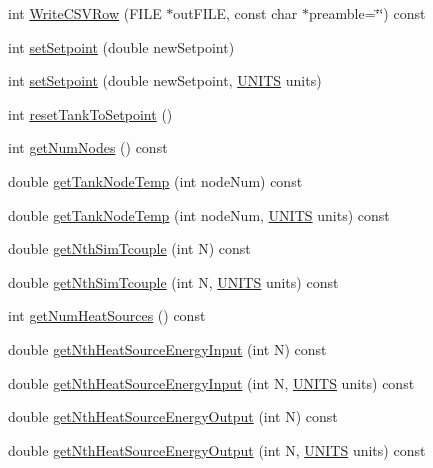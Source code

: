 \begin{DoxyCompactItemize}
\item 
int \hyperlink{class_h_p_w_h_a5652291d663296decd912fe92fb9d4e7}{Write\-C\-S\-V\-Row} (F\-I\-L\-E $\ast$out\-F\-I\-L\-E, const char $\ast$preamble=\char`\"{}\char`\"{}) const 
\item 
int \hyperlink{class_h_p_w_h_adb49b5846f9056602de57cb289e0a321}{set\-Setpoint} (double new\-Setpoint)
\item 
int \hyperlink{class_h_p_w_h_ab7d91fead271ef907cf13450055cdb06}{set\-Setpoint} (double new\-Setpoint, \hyperlink{class_h_p_w_h_a145320dbf116b9245ac4421026cff294}{U\-N\-I\-T\-S} units)
\item 
int \hyperlink{class_h_p_w_h_aac5af7347053c06dcbc446b44fa3686d}{reset\-Tank\-To\-Setpoint} ()
\item 
int \hyperlink{class_h_p_w_h_a38e4f7eb3da82c2281657702fc472b1d}{get\-Num\-Nodes} () const 
\item 
double \hyperlink{class_h_p_w_h_a440f55f294a28f9024ce4731f515b802}{get\-Tank\-Node\-Temp} (int node\-Num) const 
\item 
double \hyperlink{class_h_p_w_h_afac039cdb5bb3643eb46fdef08a88948}{get\-Tank\-Node\-Temp} (int node\-Num, \hyperlink{class_h_p_w_h_a145320dbf116b9245ac4421026cff294}{U\-N\-I\-T\-S} units) const 
\item 
double \hyperlink{class_h_p_w_h_a3fc011d8bc8302e62d45e8fc92d1ce3e}{get\-Nth\-Sim\-Tcouple} (int N) const 
\item 
double \hyperlink{class_h_p_w_h_a87a26a59001216562f01eed1a0b877fe}{get\-Nth\-Sim\-Tcouple} (int N, \hyperlink{class_h_p_w_h_a145320dbf116b9245ac4421026cff294}{U\-N\-I\-T\-S} units) const 
\item 
int \hyperlink{class_h_p_w_h_a3d41868f9f79e940f59eec10432a1aec}{get\-Num\-Heat\-Sources} () const 
\item 
double \hyperlink{class_h_p_w_h_a2c2d3a5cf77dcb66137d9f89d63b46df}{get\-Nth\-Heat\-Source\-Energy\-Input} (int N) const 
\item 
double \hyperlink{class_h_p_w_h_a81113be21e2d6704d3a9178393a40cbe}{get\-Nth\-Heat\-Source\-Energy\-Input} (int N, \hyperlink{class_h_p_w_h_a145320dbf116b9245ac4421026cff294}{U\-N\-I\-T\-S} units) const 
\item 
double \hyperlink{class_h_p_w_h_ae321e3dc14aab36ae225d49496624153}{get\-Nth\-Heat\-Source\-Energy\-Output} (int N) const 
\item 
double \hyperlink{class_h_p_w_h_a2eb42a19d26901e89f33dea5c4b3d6c9}{get\-Nth\-Heat\-Source\-Energy\-Output} (int N, \hyperlink{class_h_p_w_h_a145320dbf116b9245ac4421026cff294}{U\-N\-I\-T\-S} units) const 

\end{DoxyCompactItemize}

